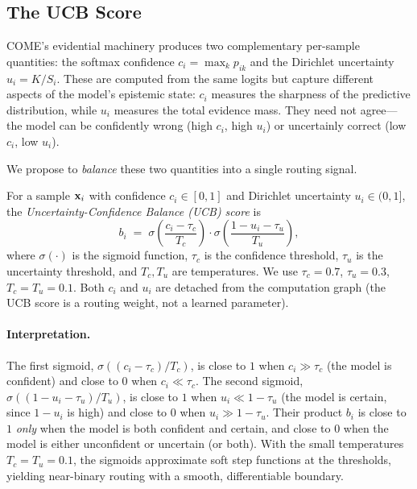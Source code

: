 \subsection{The UCB Score}
\label{sec:method:ucb}

COME's evidential machinery produces two complementary per-sample quantities: the softmax confidence $c_i = \max_k p_{ik}$ and the Dirichlet uncertainty $u_i = K/S_i$. These are computed from the same logits but capture different aspects of the model's epistemic state: $c_i$ measures the sharpness of the predictive distribution, while $u_i$ measures the total evidence mass. They need not agree---the model can be confidently wrong (high $c_i$, high $u_i$) or uncertainly correct (low $c_i$, low $u_i$).

We propose to \emph{balance} these two quantities into a single routing signal.

\begin{definition}
\label{def:ucb}
For a sample $\mathbf{x}_i$ with confidence $c_i \in [0,1]$ and Dirichlet uncertainty $u_i \in (0,1]$, the \emph{Uncertainty-Confidence Balance (UCB) score} is
\begin{equation}
  b_i \;=\; \sigma\!\left(\frac{c_i - \tau_c}{T_c}\right) \cdot \sigma\!\left(\frac{1 - u_i - \tau_u}{T_u}\right),
  \label{eq:ucb}
\end{equation}
where $\sigma(\cdot)$ is the sigmoid function, $\tau_c$ is the confidence threshold, $\tau_u$ is the uncertainty threshold, and $T_c, T_u$ are temperatures. We use $\tau_c = 0.7$, $\tau_u = 0.3$, $T_c = T_u = 0.1$. Both $c_i$ and $u_i$ are detached from the computation graph (the UCB score is a routing weight, not a learned parameter).
\end{definition}

\paragraph{Interpretation.}
The first sigmoid, $\sigma((c_i - \tau_c)/T_c)$, is close to $1$ when $c_i \gg \tau_c$ (the model is confident) and close to $0$ when $c_i \ll \tau_c$. The second sigmoid, $\sigma((1 - u_i - \tau_u)/T_u)$, is close to $1$ when $u_i \ll 1 - \tau_u$ (the model is certain, since $1 - u_i$ is high) and close to $0$ when $u_i \gg 1 - \tau_u$. Their product $b_i$ is close to $1$ \emph{only} when the model is both confident and certain, and close to $0$ when the model is either unconfident or uncertain (or both). With the small temperatures $T_c=T_u=0.1$, the sigmoids approximate soft step functions at the thresholds, yielding near-binary routing with a smooth, differentiable boundary.

